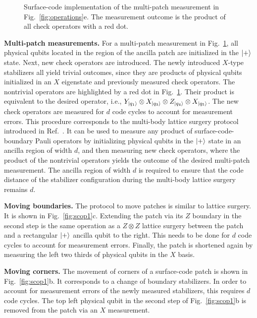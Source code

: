 \documentclass[prx,aps,letterpaper,twocolumn,allowfontchageintitle=true,accepted=2019-02-01]{quantumarticle}
\begin{document}
\begin{figure}[!t]
\centering
\def\svgwidth{\linewidth}

\caption{Surface-code implementation of the multi-patch measurement in Fig.~\ref{fig:operations}e. The measurement outcome is the product of all check operators with a red dot.}
\label{fig:scop2}
\end{figure}



\textbf{Multi-patch measurements.} For a multi-patch measurement in Fig.~\ref{fig:scop2}, all physical qubits located in the region of the ancilla patch are initialized in the $\ket{+}$ state. Next, new check operators are introduced. The newly introduced $X$-type stabilizers all yield trivial outcomes, since they are products of physical qubits initialized in an $X$ eigenstate and previously measured check operators. The nontrivial operators are highlighted by a red dot in Fig.~\ref{fig:scop2}. Their product is equivalent to the desired operator, i.e., $Y_{\ket{q_1}}\otimes X_{\ket{q_3}} \otimes Z_{\ket{q_4}} \otimes X_{\ket{q_5}}$. The new check operators are measured for $d$ code cycles to account for measurement errors. This procedure corresponds to the multi-body lattice surgery protocol introduced in Ref.~\cite{Fowler2018}. It can be used to measure any product of surface-code-boundary Pauli operators by initializing physical qubits in the $\ket{+}$ state in an ancilla region of width $d$, and then measuring new check operators, where the product of the nontrivial operators yields the outcome of the desired multi-patch measurement. The ancilla region of width $d$ is required to ensure that the code distance of the stabilizer configuration during the multi-body lattice surgery remains $d$.


\textbf{Moving boundaries.} The protocol to move patches is similar to lattice surgery. It is shown in Fig.~\ref{fig:scop1}c. Extending the patch via its $Z$ boundary in the second step is the same operation as a $Z \otimes Z$ lattice surgery between the patch and a rectangular $\ket{+}$ ancilla qubit to the right. This needs to be done for $d$ code cycles to account for measurement errors. Finally, the patch is shortened again by measuring the left two thirds of physical qubits in the $X$ basis.



\textbf{Moving corners.} The movement of corners of a surface-code patch is shown in Fig.~\ref{fig:scop1}b. It corresponds to a change of boundary stabilizers. In order to account for measurement errors of the newly measured stabilizers, this requires $d$ code cycles. The top left physical qubit in the second step of Fig.~\ref{fig:scop1}b is removed from the patch via an $X$ measurement.
\end{document}
